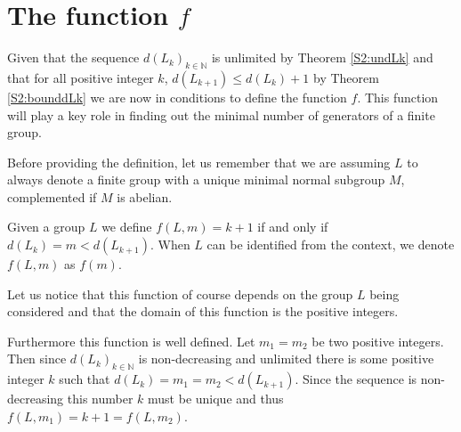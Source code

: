 \section{The function \texorpdfstring{$f$}{f}}

Given that the sequence $d(L_k)_{k \in \mathbb{N}}$ is unlimited by Theorem \ref{S2:undLk} and that for all positive integer $k$, $d(L_{k+1}) \le d(L_k) + 1$ by Theorem \ref{S2:bounddLk} we are now in conditions to define the function $f$. This function will play a key role in finding out the minimal number of generators of a finite group.

Before providing the definition, let us remember that we are assuming $L$ to always denote a finite group with a unique minimal normal subgroup $M$, complemented if $M$ is abelian.

\begin{definition}
    Given a group $L$ we define $f(L, m) = k+1$ if and only if $d(L_k) = m < d(L_{k+1})$. When $L$ can be identified from the context, we denote $f(L,m)$ as $f(m)$.
\end{definition}

Let us notice that this function of course depends on the group $L$ being considered and that the domain of this function is the positive integers. 

Furthermore this function is well defined. Let $m_1 = m_2$ be two positive integers. Then since $d(L_k)_{k \in \mathbb{N}}$ is non-decreasing and unlimited there is some positive integer $k$ such that $d(L_k) = m_1 = m_2 < d(L_{k+1})$. Since the sequence is non-decreasing this number $k$ must be unique and thus $f(L,m_1) = k+1 = f(L,m_2)$.